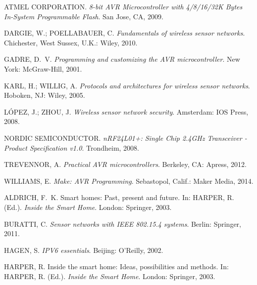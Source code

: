 {ATMEL CORPORATION. \emph{8-bit AVR Microcontroller with 4/8/16/32K Bytes
  In-System Programmable Flash}.
San Jose, CA, 2009.}

{DARGIE, W.; POELLABAUER, C. \emph{Fundamentals of wireless sensor networks}.
  Chichester, West Sussex, U.K.: Wiley, 2010.}

{GADRE, D.~V. \emph{Programming and customizing the AVR microcontroller}. New
  York: McGraw-Hill, 2001.}

{KARL, H.; WILLIG, A. \emph{Protocols and architectures for wireless sensor
  networks}. Hoboken, NJ: Wiley, 2005.}

{L\'OPEZ, J.; ZHOU, J. \emph{Wireless sensor network security}. Amsterdam: IOS
  Press, 2008.}

{NORDIC SEMICONDUCTOR. \emph{nRF24L01+: Single Chip 2.4GHz Transceiver -
  Product Specification v1.0}.
Trondheim, 2008.}

{TREVENNOR, A. \emph{Practical AVR microcontrollers}. Berkeley, CA: Apress,
  2012.}

{WILLIAMS, E. \emph{Make: AVR Programming}. Sebastopol, Calif.: Maker Media,
  2014.}

{ALDRICH, F.~K. Smart homes: Past, present and future. In:  HARPER, R. (Ed.).
  \emph{Inside the Smart Home}. London: Springer, 2003.}

{BURATTI, C. \emph{Sensor networks with IEEE 802.15.4 systems}. Berlin:
  Springer, 2011.}

{HAGEN, S. \emph{IPV6 essentials}. Beijing: O'Reilly, 2002.}

{HARPER, R. Inside the smart home: Ideas, possibilities and methods. In:
  HARPER, R. (Ed.). \emph{Inside the Smart Home}. London: Springer, 2003.}

